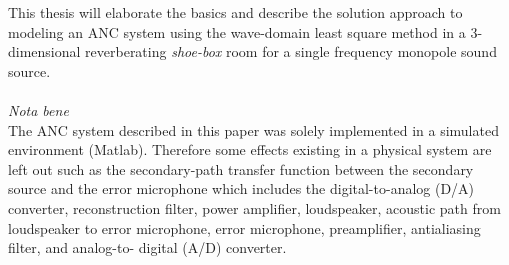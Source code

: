This thesis will elaborate the basics and describe the solution approach to modeling an ANC system using the wave-domain least square method in a 3-dimensional reverberating \textit{shoe-box} room for a single frequency monopole sound source.\\\\

\textit{Nota bene}\\
The ANC system described in this paper was solely implemented in a simulated environment (Matlab). Therefore some effects existing in a physical system are left out such as the secondary-path transfer function between the secondary source and the error microphone which includes the digital-to-analog (D/A) converter, reconstruction filter, power amplifier, loudspeaker, acoustic path from loudspeaker to error microphone, error microphone, preamplifier, antialiasing filter, and analog-to- digital (A/D) converter.\cite{Kuo1999}


